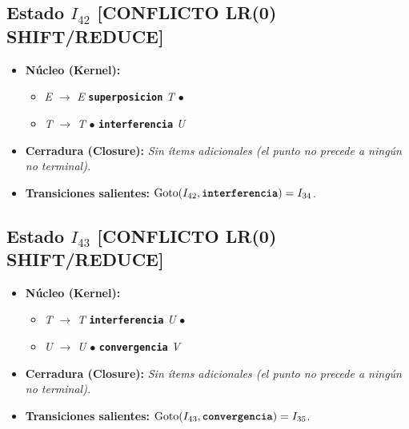 \documentclass[12pt, letterpaper]{article}
\begin{document}
\subsection*{Estado $I_{42}$  \hfill {\color{accent}\textbf{[CONFLICTO LR(0) SHIFT/REDUCE]}}}
\begin{itemize}\setlength{\itemsep}{1pt}\setlength{\parskip}{0pt}
\item \textbf{Núcleo (Kernel):}
\begin{itemize}\setlength{\itemsep}{1pt}\setlength{\parskip}{0pt}
    \item \textit{E} $\to$ \textit{E} \textbf{\texttt{superposicion}} \textit{T} $\bullet$ 
    \item \textit{T} $\to$ \textit{T} $\bullet$ \textbf{\texttt{interferencia}} \textit{U}
\end{itemize}
\item \textbf{Cerradura (Closure):} \emph{Sin ítems adicionales (el punto no precede a ningún no terminal).}
\item \textbf{Transiciones salientes:} $\text{Goto}(I_{42}, \textbf{\texttt{interferencia}}) = I_{34}$.
\end{itemize}
\vspace{2pt}
\subsection*{Estado $I_{43}$  \hfill {\color{accent}\textbf{[CONFLICTO LR(0) SHIFT/REDUCE]}}}
\begin{itemize}\setlength{\itemsep}{1pt}\setlength{\parskip}{0pt}
\item \textbf{Núcleo (Kernel):}
\begin{itemize}\setlength{\itemsep}{1pt}\setlength{\parskip}{0pt}
    \item \textit{T} $\to$ \textit{T} \textbf{\texttt{interferencia}} \textit{U} $\bullet$ 
    \item \textit{U} $\to$ \textit{U} $\bullet$ \textbf{\texttt{convergencia}} \textit{V}
\end{itemize}
\item \textbf{Cerradura (Closure):} \emph{Sin ítems adicionales (el punto no precede a ningún no terminal).}
\item \textbf{Transiciones salientes:} $\text{Goto}(I_{43}, \textbf{\texttt{convergencia}}) = I_{35}$.
\end{itemize}
\vspace{2pt}
\end{document}
